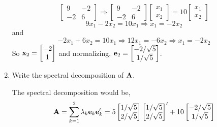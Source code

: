 \begin{enumerate}[label=(\alph*)]
\[\begin{bmatrix}
                    9 & -2 \\
                    -2 & 6
                \end{bmatrix} \Rightarrow
                \begin{bmatrix}
                    9 & -2 \\
                    -2 & 6
                \end{bmatrix}
                \begin{bmatrix}
                    x_1 \\
                    x_2
                \end{bmatrix} = 
                10\begin{bmatrix}
                    x_1 \\
                    x_2
                \end{bmatrix}
            \]
            \[
                9x_1 - 2x_2 = 10x_1 \Rightarrow x_1 = -2x_2
            \]
            and
            \[
                -2x_1 + 6x_2 = 10x_1 \Rightarrow 12x_1 = -6x_2 \Rightarrow x_1 = -2x_2
            \]
            So $\bold{x}_2 = \begin{bmatrix}
                -2 \\
                1
            \end{bmatrix}$ and normalizing, $\bold{e}_2 = \begin{bmatrix}
                -2/\sqrt{5} \\
                1/\sqrt{5}
            \end{bmatrix}$.
            \item Write the spectral decomposition of $\bold{A}$.
            \par
            The spectral decomposition would be,
            \[
                \bold{A} = \sum_{k=1}^2{\lambda_k\bold{e}_k\bold{e}_k^\prime} = 
                5 \begin{bmatrix}
                    1/\sqrt{5} \\
                    2/\sqrt{5}
                \end{bmatrix}
                \begin{bmatrix}
                    1/\sqrt{5} \\
                    2/\sqrt{5}
                \end{bmatrix}^\prime + 
                10 \begin{bmatrix}
                    -2/\sqrt{5} \\
                    1/\sqrt{5}

\end{bmatrix}\]
\end{enumerate}
